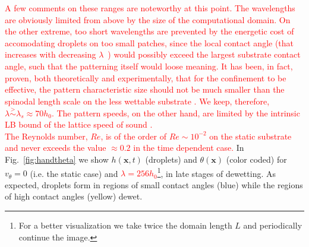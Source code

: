 \documentclass[twocolumn,amsmath,amssymb,showpacs,prl,superscriptaddress]{revtex4-1} %
\begin{document}
\textcolor{red}{A few comments on these ranges are noteworthy at this point. The wavelengths are obviously limited from above by the size of the computational domain. On the other extreme, too short wavelengths are prevented by
the energetic cost of accomodating droplets on too
small patches, since the local contact angle 
(that increases with decreasing $\lambda$~\cite{SuppMat}) would possibly exceed the largest substrate contact angle, such that the patterning 
itself would loose meaning. 
It has been, in fact, proven, both theoretically and experimentally, that 
for the confinement to be effective, the pattern characteristic size should 
not be much smaller than the spinodal length scale on the less wettable substrate
\cite{KarguptaJCP2002,KarguptaLangmuir2000,Nisato1999,Karim1998}.
We keep, therefore, $\lambda \stackrel{>}{\sim} \lambda_s \approx 70 h_0$.
The pattern speeds, on the other hand, are limited by the intrinsic LB bound of the lattice speed of sound
 \cite{succi}.}\\
\textcolor{red}{The Reynolds number, $Re$, is of the order of $Re \sim 10^{-2}$ on the 
static substrate and never exceeds the value $\approx 0.2$ in the time dependent case.}
In Fig.~\ref{fig:handtheta} we show $h(\mathbf{x},t)$ (droplets) and $\theta(\mathbf{x})$ (color coded) for $v_{\theta} = 0$ (i.e. the static case) and \textcolor{red}{$\lambda = 256 h_0$}\footnote{For a better visualization we take twice the domain length $L$ and periodically continue the image.}, in late stages of dewetting.
As expected, droplets form in regions of small contact angles (blue) while the regions of high contact angles (yellow) dewet.\\
\end{document}

